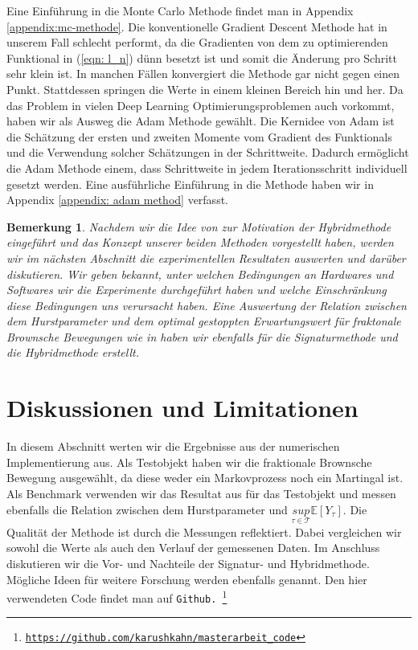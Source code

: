 \documentclass[12pt,titlepage,headsepline]{article}
\newtheorem*{bemerkung*}{Bemerkung}
\begin{document}
      Eine Einführung in die Monte Carlo Methode findet man in Appendix \ref{appendix:mc-methode}. Die konventionelle Gradient Descent Methode hat in unserem Fall schlecht performt, da die Gradienten von dem zu optimierenden Funktional in (\ref{eqn: l_n}) dünn besetzt ist und somit die Änderung pro Schritt sehr klein ist. In manchen Fällen konvergiert die Methode gar nicht gegen einen Punkt. Stattdessen springen die Werte in einem kleinen Bereich hin und her. Da das Problem in vielen Deep Learning Optimierungsproblemen auch vorkommt, haben wir als Ausweg die Adam Methode \cite{kingma_adam_2017} gewählt. Die Kernidee von Adam ist die Schätzung der ersten und zweiten Momente vom Gradient des Funktionals und die Verwendung solcher Schätzungen in der Schrittweite. Dadurch ermöglicht die Adam Methode einem, dass Schrittweite in jedem Iterationsschritt individuell gesetzt werden. Eine ausführliche Einführung in die Methode haben wir in Appendix \ref{appendix: adam method} verfasst.
      \begin{bemerkung*}
        \textup{
        Nachdem wir die Idee von \cite{becker_deep_2019} zur Motivation der Hybridmethode eingeführt und das Konzept unserer beiden Methoden vorgestellt haben, werden wir im nächsten Abschnitt die experimentellen Resultaten auswerten und darüber diskutieren. Wir geben bekannt, unter welchen Bedingungen an Hardwares und Softwares wir die Experimente durchgeführt haben und welche Einschränkung diese Bedingungen uns verursacht haben. Eine Auswertung der Relation zwischen dem Hurstparameter und dem optimal gestoppten Erwartungswert für fraktonale Brownsche Bewegungen wie in \cite{becker_deep_2019} haben wir ebenfalls für die Signaturmethode und die Hybridmethode erstellt.
        }
      \end{bemerkung*}

      \newpage

    \section{Diskussionen und Limitationen}
      In diesem Abschnitt werten wir die Ergebnisse aus der numerischen Implementierung aus. Als Testobjekt haben wir die fraktionale Brownsche Bewegung ausgewählt, da diese weder ein Markovprozess noch ein Martingal ist. Als Benchmark verwenden wir das Resultat aus \cite{becker_deep_2019} für das Testobjekt und messen ebenfalls die Relation zwischen dem Hurstparameter und $\underset{\tau \in \mathcal{T}}{sup} \mathbb{E}[Y_{\tau}]$. Die Qualität der Methode ist durch die Messungen reflektiert. Dabei vergleichen wir sowohl die Werte als auch den Verlauf der gemessenen Daten.
      \hfill\break
      Im Anschluss diskutieren wir die Vor- und Nachteile der Signatur- und Hybridmethode. Mögliche Ideen für weitere Forschung werden ebenfalls genannt.
      Den hier verwendeten Code findet man auf \texttt {Github. \footnote{\url{https://github.com/karushkahn/masterarbeit_code}}}
\end{document}
